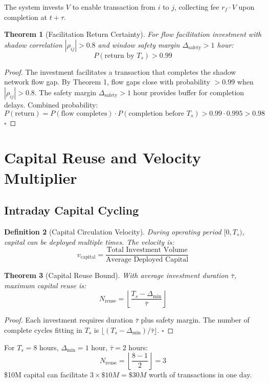\documentclass[12pt]{article}
\newtheorem{theorem}{Theorem}
\newtheorem{definition}[theorem]{Definition}
\begin{document}
The system invests $V$ to enable transaction from $i$ to $j$, collecting fee $r_f \cdot V$ upon completion at $t+\tau$.

\begin{theorem}[Facilitation Return Certainty]
For flow facilitation investment with shadow correlation $|\rho_{ij}| > 0.8$ and window safety margin $\Delta_{\text{safety}} > 1$ hour:
$$
P(\text{return by } T_s) > 0.99
$$
\end{theorem}

\begin{proof}
The investment facilitates a transaction that completes the shadow network flow gap. By Theorem 1, flow gaps close with probability $> 0.99$ when $|\rho_{ij}| > 0.8$. The safety margin $\Delta_{\text{safety}} > 1$ hour provides buffer for completion delays. Combined probability:
$$
P(\text{return}) = P(\text{flow completes}) \cdot P(\text{completion before } T_s) > 0.99 \cdot 0.995 > 0.98
$$
$\square$
\end{proof}

\section{Capital Reuse and Velocity Multiplier}

\subsection{Intraday Capital Cycling}

\begin{definition}[Capital Circulation Velocity]
During operating period $[0, T_s)$, capital can be deployed multiple times. The velocity is:
$$
v_{\text{capital}} = \frac{\text{Total Investment Volume}}{\text{Average Deployed Capital}}
$$
\end{definition}

\begin{theorem}[Capital Reuse Bound]
With average investment duration $\bar{\tau}$, maximum capital reuse is:
$$
N_{\text{reuse}} = \left\lfloor \frac{T_s - \Delta_{\min}}{\bar{\tau}} \right\rfloor
$$
\end{theorem}

\begin{proof}
Each investment requires duration $\bar{\tau}$ plus safety margin. The number of complete cycles fitting in $T_s$ is $\lfloor (T_s - \Delta_{\min})/\bar{\tau} \rfloor$.
$\square$
\end{proof}

\begin{example}
For $T_s = 8$ hours, $\Delta_{\min} = 1$ hour, $\bar{\tau} = 2$ hours:
$$
N_{\text{reuse}} = \left\lfloor \frac{8 - 1}{2} \right\rfloor = 3
$$
\$10M capital can facilitate $3 \times \$10M = \$30M$ worth of transactions in one day.
\end{example}
\end{document}
